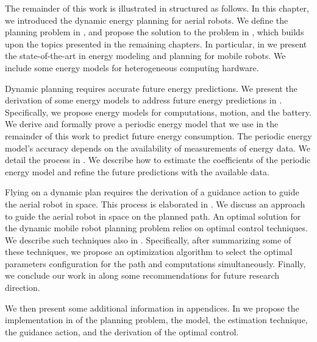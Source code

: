 The remainder of this work is illustrated in  structured as follows. In this chapter, we introduced the dynamic energy planning for aerial robots. We define the planning problem in , and propose the solution to the problem in , which builds upon the topics presented in the remaining chapters. In particular, in  we present the state-of-the-art in energy modeling and planning for mobile robots. We include some energy models for heterogeneous computing hardware.

Dynamic planning requires accurate future energy predictions. We present the derivation of some energy models to address future energy predictions in . Specifically, we propose energy models for computations, motion, and the battery. We derive and formally prove a periodic energy model that we use in the remainder of this work to predict future energy consumption. The periodic energy model's accuracy depends on the availability of measurements of energy data. We detail the process in . We describe how to estimate the coefficients of the periodic energy model and refine the future predictions with the available data.

Flying on a dynamic plan requires the derivation of a guidance action to guide the aerial robot in space. This process is elaborated in . We discuss an approach to guide the aerial robot in space on the planned path. 
An optimal solution for the dynamic mobile robot planning problem relies on optimal control techniques. We describe such techniques also in . Specifically, after summarizing some of these techniques, we propose an optimization algorithm to select the optimal parameters configuration for the path and computations simultaneously. Finally, we conclude our work in  along some recommendations for future research direction. 

We then present some additional information in appendices. In  we propose the implementation in \matlab of the planning problem, the model, the estimation technique, the guidance action, and the derivation of the optimal control. 

